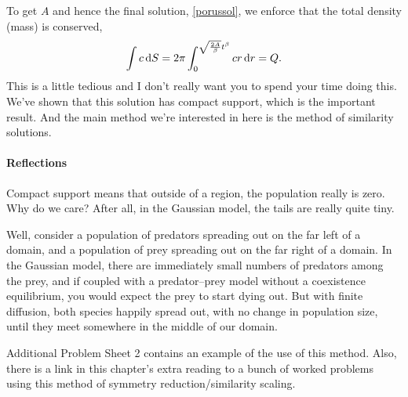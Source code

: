 \documentclass[main.tex]{subfiles}
\begin{document}
To get $A$ and hence the final solution, \cref{porussol}, we enforce that the total density (mass) is conserved,
\begin{equation}
	\int c \, \mathrm{d} S = 2 \pi \int_0^{\sqrt{\frac{2A}{\beta}}t^\beta} c r \, \mathrm{d} r = Q. 
\end{equation}
This is a little tedious and I don't really want you to spend your time doing this. We've shown that this solution has compact support, which is the important result. And the main method we're interested in here is the method of similarity solutions. 

\paragraph{Reflections}
Compact support means that outside of a region, the population really is zero. Why do we care? After all, in the Gaussian model, the tails are really quite tiny. 

Well, consider a population of predators spreading out on the far left of a domain, and a population of prey spreading out on the far right of a domain. In the Gaussian model, there are immediately small numbers of predators among the prey, and if coupled with a predator--prey model without a coexistence equilibrium, you would expect the prey to start dying out. But with finite diffusion, both species happily spread out, with no change in population size, until they meet somewhere in the middle of our domain.

\begin{do-it-yourself}
Additional Problem Sheet 2 contains an example of the use of this method. Also, there is a link in this chapter's extra reading to a bunch of worked problems using this method of symmetry reduction/similarity scaling.
\end{do-it-yourself}
\end{document}
